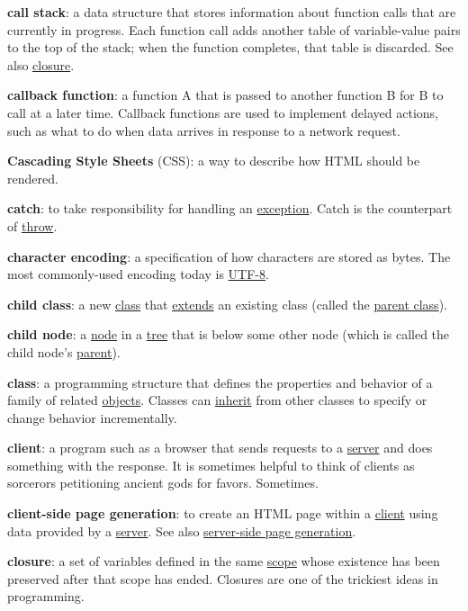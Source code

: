 \textbf{call stack}: a data structure that stores information about
function calls that are currently in progress. Each function call adds
another table of variable-value pairs to the top of the stack; when the
function completes, that table is discarded. See also
\protect\hyperlink{g:closure}{closure}.

\textbf{callback function}: a function A that is passed to another
function B for B to call at a later time. Callback functions are used to
implement delayed actions, such as what to do when data arrives in
response to a network request.

\textbf{Cascading Style Sheets} (CSS): a way to describe how HTML should
be rendered.

\textbf{catch}: to take responsibility for handling an
\protect\hyperlink{g:exception}{exception}. Catch is the counterpart of
\protect\hyperlink{g:throw}{throw}.

\textbf{character encoding}: a specification of how characters are
stored as bytes. The most commonly-used encoding today is
\protect\hyperlink{g:utf-8}{UTF-8}.

\textbf{child class}: a new \protect\hyperlink{g:class}{class} that
\protect\hyperlink{g:extend}{extends} an existing class (called the
\protect\hyperlink{g:parent-class}{parent class}).

\textbf{child node}: a \protect\hyperlink{g:node}{node} in a
\protect\hyperlink{g:tree}{tree} that is below some other node (which is
called the child node's \protect\hyperlink{g:parent-node}{parent}).

\textbf{class}: a programming structure that defines the properties and
behavior of a family of related \protect\hyperlink{g:object}{objects}.
Classes can \protect\hyperlink{g:inherit}{inherit} from other classes to
specify or change behavior incrementally.

\textbf{client}: a program such as a browser that sends requests to a
\protect\hyperlink{g:server}{server} and does something with the
response. It is sometimes helpful to think of clients as sorcerors
petitioning ancient gods for favors. Sometimes.

\textbf{client-side page generation}: to create an HTML page within a
\protect\hyperlink{g:client}{client} using data provided by a
\protect\hyperlink{g:server}{server}. See also
\protect\hyperlink{g:server-side-page-generation}{server-side page
generation}.

\textbf{closure}: a set of variables defined in the same
\protect\hyperlink{g:scope}{scope} whose existence has been preserved
after that scope has ended. Closures are one of the trickiest ideas in
programming.

